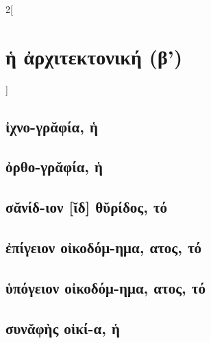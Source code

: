 \documentclass{book}
\begin{document}
\begin{multicols}{2}[\section{ἡ ἀρχιτεκτονική (β')}]
\subsection{ἰχνο-γρᾰφία, ἡ}
\subsection{ὀρθο-γρᾰφία, ἡ}
\subsection{σᾰνίδ-ιον [ῐδ] θῠρίδος, τό}
\subsection{ἐπίγειον οἰκοδόμ-ημα, ατος, τό}
\subsection{ὑπόγειον οἰκοδόμ-ημα, ατος, τό}
\subsection{συνᾰφὴς οἰκί-α, ἡ}
~
\end{multicols}
\newpage  
\end{document}

